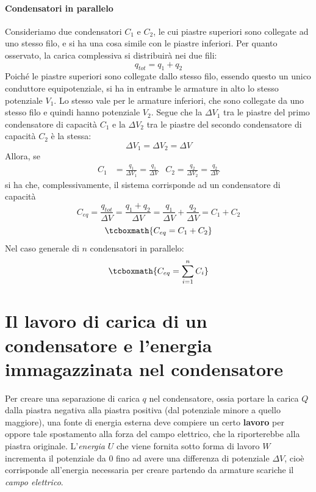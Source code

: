 \paragraph{Condensatori in parallelo}
Consideriamo due condensatori $C_1$ e $C_2$, le cui piastre superiori sono collegate ad uno stesso filo, e si ha una cosa simile con le piastre inferiori.
Per quanto osservato, la carica complessiva si distribuirà nei due fili:
\begin{equation*}
	q_{tot}=q_1+q_2
\end{equation*}
Poiché le piastre superiori sono collegate dallo stesso filo, essendo questo un unico conduttore equipotenziale, si ha in entrambe le armature in alto lo stesso potenziale $V_1$. Lo stesso vale per le armature inferiori, che sono collegate da uno stesso filo e quindi hanno potenziale $V_2$. Segue che la \ddp $\Delta V_1$ tra le piastre del primo condensatore di capacità $C_1$ e la \ddp $\Delta V_2$ tra le piastre del secondo condensatore di capacità $C_2$ è la stessa:
\begin{equation*}
	\Delta V_1=\Delta V_2=\Delta V
\end{equation*}
Allora, se
\begin{align*}
	C_1&=\frac{q_1}{\Delta V_1}=\frac{q_1}{\Delta V} & C_2=\frac{q_2}{\Delta V_2}=\frac{q_2}{\Delta V}
\end{align*}
si ha che, complessivamente, il sistema corrisponde ad un condensatore di capacità
\begin{equation*}
	C_{eq}=\frac{q_{tot}}{\Delta V}=\frac{q_1+q_2}{\Delta V}=\frac{q_1}{\Delta V}+\frac{q_2}{\Delta V}=C_1+C_2
\end{equation*}
\begin{equation}
	\tcboxmath{C_{eq}=C_1+C_2}
\end{equation}
Nel caso generale di $n$ condensatori in parallelo:
\begin{equation}
	\tcboxmath{C_{eq}=\sum_{i=1}^{n}C_i}
\end{equation}
\section{Il lavoro di carica di un condensatore e l'energia immagazzinata nel condensatore} %
Per creare una separazione di carica $q$ nel condensatore, ossia portare la carica $Q$ dalla piastra negativa alla piastra positiva (dal potenziale minore a quello maggiore), una fonte di energia esterna deve compiere un certo \textbf{lavoro} per oppore tale spostamento alla forza del campo elettrico, che la riporterebbe alla piastra originale. L'\textit{energia} $U$ che viene fornita sotto forma di lavoro $W$ incrementa il potenziale da $0$ fino ad avere una differenza di potenziale $\Delta V$, cioè corrisponde all'energia necessaria per creare partendo da armature scariche il \textit{campo elettrico}.

